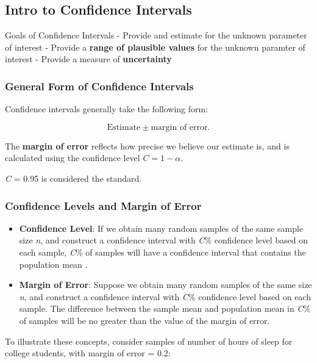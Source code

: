 \documentclass[
  openany]{book}
\providecommand{\tightlist}{%
  \setlength{\itemsep}{0pt}\setlength{\parskip}{0pt}}
\begin{document}
\subsection{Intro to Confidence Intervals}\label{intro-to-confidence-intervals}

Goals of Confidence Intervals - Provide and estimate for the unknown parameter of interest - Provide a \textbf{range of plausible values} for the unknown paramter of interest - Provide a measure of \textbf{uncertainty}

\subsubsection{General Form of Confidence Intervals}\label{general-form-of-confidence-intervals}

Confidence intervals generally take the following form:

\begin{equation}
\text{Estimate} \pm \text{margin of error}.
\label{eq:cigeneral}
\end{equation}

The \textbf{margin of error} reflects how precise we believe our estimate is, and is calculated using the confidence level \(C=1-\alpha\).

\emph{C} = 0.95 is considered the standard.

\subsubsection{Confidence Levels and Margin of Error}\label{confidence-levels-and-margin-of-error}

\begin{itemize}
\tightlist
\item
  \textbf{Confidence Level}: If we obtain many random samples of the same sample size \emph{n}, and construct a confidence interval with \emph{C}\% confidence level based on each sample, \emph{C}\% of samples will have a confidence interval that contains the population mean \mu.
\item
  \textbf{Margin of Error}: Suppose we obtain many random samples of the same size \emph{n}, and construct a confidence interval with \emph{C}\% confidence level based on each sample. The difference between the sample mean and population mean in \emph{C}\% of samples will be no greater than the value of the margin of error.
\end{itemize}

To illustrate these concepts, consider samples of number of hours of sleep for college students, with margin of error = 0.2:
\end{document}
